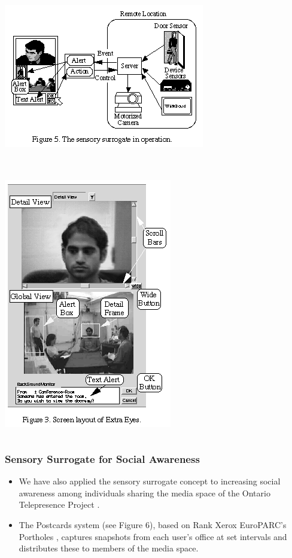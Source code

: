 \documentclass{beamer}
\begin{document}
\begin{frame}
\frametitle{}


\begin{columns}

\centerline{\includegraphics[width=0.500000\linewidth,keepaspectratio]{ky_fg5.png}}

\end{columns}

\end{frame}

\begin{frame}
\frametitle{}


\begin{columns}

\centerline{\includegraphics[width=0.500000\linewidth,keepaspectratio]{ky_fg3.png}}

\end{columns}

\end{frame}

\begin{frame}
\frametitle{Sensory Surrogate for Social Awareness}

\begin{itemize}
\item We have also applied the sensory surrogate concept to increasing social awareness among individuals sharing the media space of the Ontario Telepresence Project .
\item The Postcards system (see Figure 6), based on Rank Xerox EuroPARC's Portholes , captures snapshots from each user's office at set intervals and distributes these to members of the media space.
\end{itemize}

\end{frame}
\end{document}
